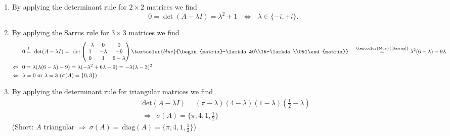 {\color{solution}
\begin{enumerate}
	\item By applying the determinant rule for $2\times2$ matrices we find $$0 = \det(A-\lambda I) = \lambda^2 +1 ~~~\Leftrightarrow ~~~ \lambda \in \{-i, +i\}.$$
	\item By applying the Sarrus rule for $3\times3$ matrices we find \begin{align*}
	&0\stackrel{!}{=}~\text{det}(A-\lambda I)
	=~\text{det}\begin{pmatrix}-\lambda&0&0\\1&-\lambda&-9\\0&1&6-\lambda\end{pmatrix}\textcolor{blue}{\begin{matrix}-\lambda&0\\1&-\lambda\\0&1\end{matrix}}~~~\stackrel{\textcolor{blue}{\text{[Sarrus]}}}{=}
	\lambda^2(6-\lambda)-9\lambda\\
	\Leftrightarrow~~&0
	=\lambda(\lambda(6-\lambda)-9)
	=\lambda(-\lambda^2+6\lambda-9)
	=-\lambda(\lambda-3)^2\\
	\Leftrightarrow~~&\lambda 
	= 0~\text{or}~\lambda
	=3~(\sigma(A)=\{0,3\})
	\end{align*}
		\item By applying the determinant rule for triangular matrices we find
	\begin{align*}
	&\text{det}(A-\lambda I)=(\pi-\lambda)(4-\lambda)(1-\lambda)\left(\frac{1}{2}-\lambda\right)\\
	&\Rightarrow~~\sigma(A)=\{\pi,4,1,\frac{1}{2}\}~~
	\end{align*}
	(Short: 	$A$ triangular  $ \Rightarrow~\sigma(A)=~\text{diag}(A)=\{\pi,4,1,\frac{1}{2}\} $)
\end{enumerate}
}
